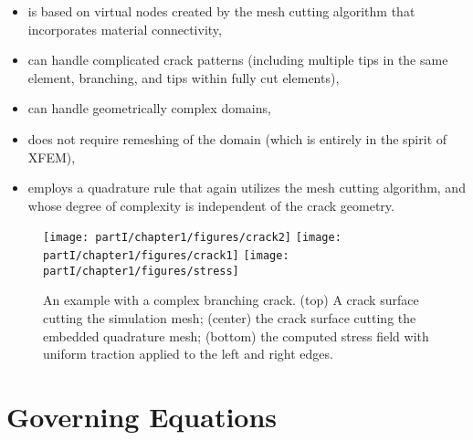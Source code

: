 \begin{itemize}
\item is based on virtual nodes created by the mesh cutting algorithm that incorporates material connectivity,
\item can handle complicated crack patterns (including multiple tips in the same element, branching, and tips within fully cut elements),
\item can handle geometrically complex domains,
\item does not require remeshing of the domain (which is entirely in the spirit of XFEM),
\item employs a quadrature rule that again utilizes the mesh cutting algorithm, and whose degree of complexity is independent of the crack geometry.
\end{itemize}

\setlength{\figurewidth}{0.79\textwidth}
\begin{figure}[htbp]
\centering
\texttt{[image: partI/chapter1/figures/crack2]}
\texttt{[image: partI/chapter1/figures/crack1]}
\texttt{[image: partI/chapter1/figures/stress]}
\caption{An example with a complex branching crack. (top) A crack surface cutting the simulation mesh; (center) the crack surface cutting the embedded quadrature mesh; (bottom) the computed stress field with uniform traction applied to the left and right edges.}
\label{fig:chap1.introexample}
\end{figure}

\section{Governing Equations}


